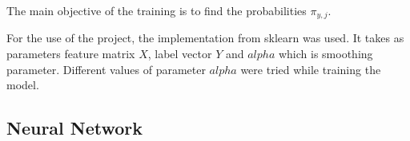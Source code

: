 \documentclass{article}
\begin{document}
The main objective of the training is to find the probabilities $\pi_{y, j}$.

For the use of the project, the implementation from sklearn was used. It takes as parameters feature matrix $X$, label vector $Y$ and $alpha$ which is smoothing parameter. Different values of parameter $alpha$ were tried while training the model. 

\subsection{Neural Network}
\label{subsection:neural_network}
\end{document}
